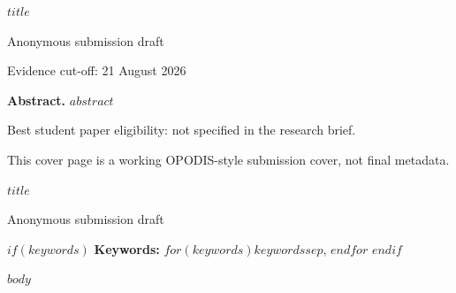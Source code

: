 \documentclass[10pt,a4paper]{article}
\begin{document}
\begin{titlepage}
\centering
\vspace*{22mm}
{\LARGE\bfseries $title$\par}
\vspace{14mm}
{\large Anonymous submission draft\par}
\vspace{8mm}
{\small Evidence cut-off: 21 August 2026\par}
\vfill
\begin{minipage}{0.88\textwidth}
\textbf{Abstract.}
$abstract$
\end{minipage}
\vfill
{\small Best student paper eligibility: not specified in the research brief.\par}
{\small This cover page is a working OPODIS-style submission cover, not final metadata.\par}
\end{titlepage}

\begin{center}
{\LARGE\bfseries $title$\par}
\vspace{1.0em}
{\large Anonymous submission draft\par}
\end{center}

\begin{abstract}
$abstract$
\end{abstract}

$if(keywords)$
\noindent\textbf{Keywords:} $for(keywords)$$keywords$$sep$, $endfor$
\vspace{0.6em}
$endif$

$body$
\end{document}

